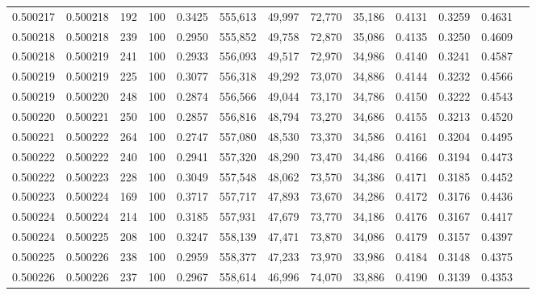 \begin{tabular}{rrrrrrrrrrrrr}
0.500217 & 0.500218 &   192 & 100 &                                     0.3425 & 555,613 &  49,997 &  72,770 &  35,186 & 0.4131 & 0.3259 & 0.4631 \\
0.500218 & 0.500218 &   239 & 100 &                                     0.2950 & 555,852 &  49,758 &  72,870 &  35,086 & 0.4135 & 0.3250 & 0.4609 \\
0.500218 & 0.500219 &   241 & 100 &                                     0.2933 & 556,093 &  49,517 &  72,970 &  34,986 & 0.4140 & 0.3241 & 0.4587 \\
0.500219 & 0.500219 &   225 & 100 &                                     0.3077 & 556,318 &  49,292 &  73,070 &  34,886 & 0.4144 & 0.3232 & 0.4566 \\
0.500219 & 0.500220 &   248 & 100 &                                     0.2874 & 556,566 &  49,044 &  73,170 &  34,786 & 0.4150 & 0.3222 & 0.4543 \\
0.500220 & 0.500221 &   250 & 100 &                                     0.2857 & 556,816 &  48,794 &  73,270 &  34,686 & 0.4155 & 0.3213 & 0.4520 \\
0.500221 & 0.500222 &   264 & 100 &                                     0.2747 & 557,080 &  48,530 &  73,370 &  34,586 & 0.4161 & 0.3204 & 0.4495 \\
0.500222 & 0.500222 &   240 & 100 &                                     0.2941 & 557,320 &  48,290 &  73,470 &  34,486 & 0.4166 & 0.3194 & 0.4473 \\
0.500222 & 0.500223 &   228 & 100 &                                     0.3049 & 557,548 &  48,062 &  73,570 &  34,386 & 0.4171 & 0.3185 & 0.4452 \\
0.500223 & 0.500224 &   169 & 100 &                                     0.3717 & 557,717 &  47,893 &  73,670 &  34,286 & 0.4172 & 0.3176 & 0.4436 \\
0.500224 & 0.500224 &   214 & 100 &                                     0.3185 & 557,931 &  47,679 &  73,770 &  34,186 & 0.4176 & 0.3167 & 0.4417 \\
0.500224 & 0.500225 &   208 & 100 &                                     0.3247 & 558,139 &  47,471 &  73,870 &  34,086 & 0.4179 & 0.3157 & 0.4397 \\
0.500225 & 0.500226 &   238 & 100 &                                     0.2959 & 558,377 &  47,233 &  73,970 &  33,986 & 0.4184 & 0.3148 & 0.4375 \\
0.500226 & 0.500226 &   237 & 100 &                                     0.2967 & 558,614 &  46,996 &  74,070 &  33,886 & 0.4190 & 0.3139 & 0.4353 \\

\end{tabular}
